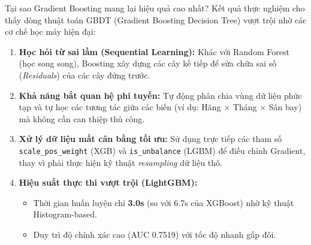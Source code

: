 \begin{frame}{Tại sao Gradient Boosting mang lại hiệu quả cao nhất?}
  Kết quả thực nghiệm cho thấy dòng thuật toán GBDT (Gradient Boosting Decision Tree) vượt trội nhờ các cơ chế học máy hiện đại:
  
  \begin{enumerate}
      \item \textbf{Học hỏi từ sai lầm (Sequential Learning):} Khác với Random Forest (học song song), Boosting xây dựng các cây kế tiếp để sửa chữa sai số (\textit{Residuals}) của các cây đứng trước.
      \item \textbf{Khả năng bắt quan hệ phi tuyến:} Tự động phân chia vùng dữ liệu phức tạp và tự học các tương tác giữa các biến (ví dụ: Hãng $\times$ Tháng $\times$ Sân bay) mà không cần can thiệp thủ công.
      \item \textbf{Xử lý dữ liệu mất cân bằng tối ưu:} Sử dụng trực tiếp các tham số \texttt{scale\_pos\_weight} (XGB) và \texttt{is\_unbalance} (LGBM) để điều chỉnh Gradient, thay vì phải thực hiện kỹ thuật \textit{resampling} dữ liệu thô.
      \item \textbf{Hiệu suất thực thi vượt trội (LightGBM):} 
      \begin{itemize}
        \item Thời gian huấn luyện chỉ \textbf{3.0s} (so với 6.7s của XGBoost) nhờ kỹ thuật Histogram-based.
        \item Duy trì độ chính xác cao (AUC 0.7519) với tốc độ nhanh gấp đôi.
      \end{itemize}
  \end{enumerate}
  
\end{frame}


